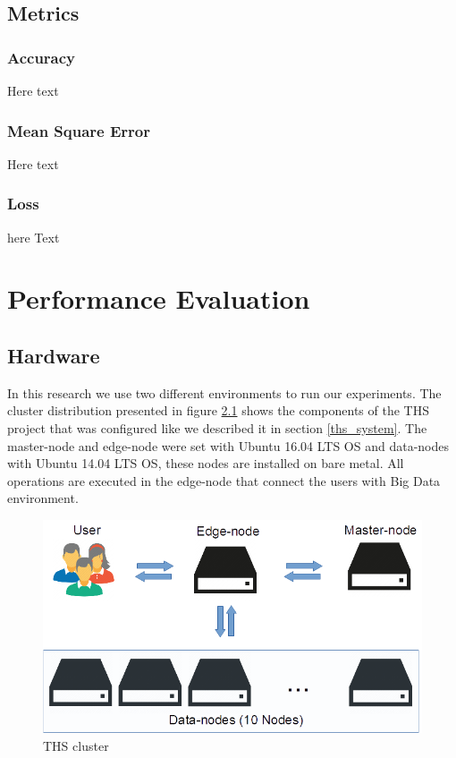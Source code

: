 \documentclass[12pt]{report}
\begin{document}
\section{Metrics}
\subsection{Accuracy}
Here text
\subsection{Mean Square Error}
Here text
\subsection{Loss}
here Text

\chapter{Performance Evaluation} \label{chapter 5}
\section{Hardware} 

In this research we use two different environments to run our experiments. The cluster distribution presented in figure \ref{figure:ths_cluster} shows the components of the \ac{THS} project that was configured like we described it in section \ref{ths_system}. The master-node and edge-node were set with Ubuntu 16.04 LTS \ac{OS} and data-nodes with Ubuntu 14.04 LTS \ac{OS}, these nodes are installed on bare metal. All operations are executed in the edge-node that connect the users with Big Data environment.

\begin{figure}[H]	
	\centering
	\includegraphics[width=150mm, scale = 1]{images/7_ths_cluster.png}	
	\caption{\ac{THS} cluster}	
	\label{figure:ths_cluster}
\end{figure}
\end{document}
